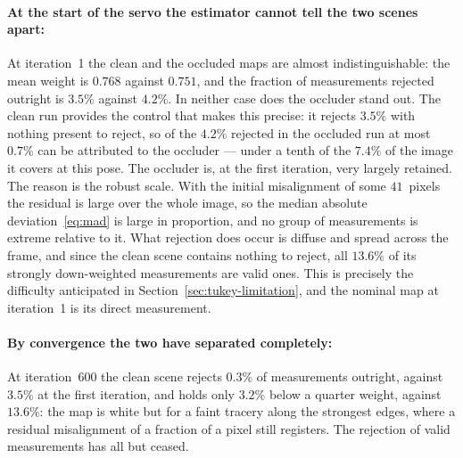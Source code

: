 \paragraph{At the start of the servo the estimator cannot tell the two scenes
apart:}
At iteration~1 the clean and the occluded maps are almost indistinguishable:
the mean weight is $0.768$ against $0.751$, and the fraction of measurements
rejected outright is $3.5\%$ against $4.2\%$. In neither case does the
occluder stand out. The clean run provides the control that makes this
precise: it rejects $3.5\%$ with nothing present to reject, so of the $4.2\%$
rejected in the occluded run at most $0.7\%$ can be attributed to the
occluder --- under a tenth of the $7.4\%$ of the image it covers at this pose.
The occluder is, at the first iteration, very largely retained.
The reason is the robust scale. With the initial misalignment of some
$41$~pixels the residual is large over the whole image, so the median
absolute deviation~\eqref{eq:mad} is large in proportion, and no group of
measurements is extreme relative to it. What rejection does occur is diffuse
and spread across the frame, and since the clean scene contains nothing to
reject, all $13.6\%$ of its strongly down-weighted measurements are valid
ones. This is precisely the difficulty anticipated in
Section~\ref{sec:tukey-limitation}, and the nominal map at iteration~1 is its
direct measurement.

\paragraph{By convergence the two have separated completely:}
At iteration~600 the clean scene rejects $0.3\%$ of measurements outright,
against $3.5\%$ at the first iteration, and holds only $3.2\%$ below a quarter
weight, against $13.6\%$: the map is white but for a faint tracery along the
strongest edges, where a residual misalignment of a fraction of a pixel still
registers. The rejection of valid measurements has all but ceased.

